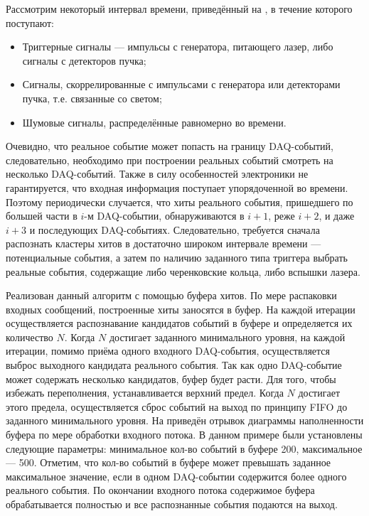 Рассмотрим некоторый интервал времени, приведённый на , в течение которого поступают:
\begin{itemize}
\item {Триггерные сигналы --- импульсы с генератора, питающего лазер, либо сигналы с детекторов пучка;}
\item {Сигналы, скоррелированные с импульсами с генератора или детекторами пучка, т.е. связанные со светом;}
\item {Шумовые сигналы, распределённые равномерно во времени.}
\end{itemize}

Очевидно, что реальное событие может попасть на границу DAQ-событий, следовательно, необходимо при построении реальных событий смотреть на несколько DAQ-событий. Также в силу особенностей электроники не гарантируется, что входная информация поступает упорядоченной во времени. Поэтому периодически случается, что хиты реального события, пришедшего по большей части в $i$-м DAQ-событии, обнаруживаются в $i+1$, реже $i+2$, и даже $i+3$ и последующих DAQ-событиях. Следовательно, требуется сначала распознать кластеры хитов в достаточно широком интервале времени --- потенциальные события, а затем по наличию заданного типа триггера выбрать реальные события, содержащие либо черенковские кольца, либо вспышки лазера.

Реализован данный алгоритм с помощью буфера хитов. По мере распаковки входных сообщений, построенные хиты заносятся в буфер. На каждой итерации осуществляется распознавание кандидатов событий в буфере и определяется их количество $N$. Когда $N$ достигает заданного минимального уровня, на каждой итерации, помимо приёма одного входного DAQ-события, осуществляется выброс выходного кандидата реального события. Так как одно DAQ-событие может содержать несколько кандидатов, буфер будет расти. Для того, чтобы избежать переполнения, устанавливается верхний предел. Когда $N$ достигает этого предела, осуществляется сброс событий на выход по принципу FIFO до заданного минимального уровня. На  приведён отрывок диаграммы наполненности буфера по мере обработки входного потока. В данном примере были установлены следующие параметры: минимальное кол-во событий в буфере 200, максимальное --- 500. Отметим, что кол-во событий в буфере может превышать заданное максимальное значение, если в одном DAQ-событии содержится более одного реального события. По окончании входного потока содержимое буфера обрабатывается полностью и все распознанные события подаются на выход.

